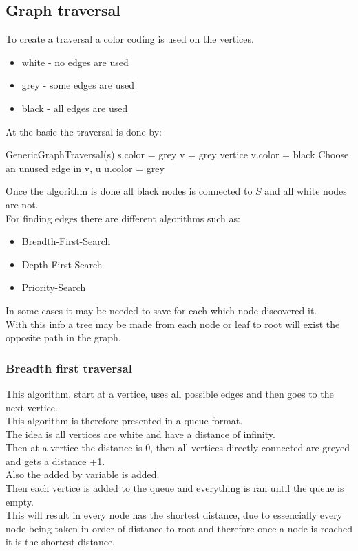 \documentclass[12pt, a4paper]{article}
\begin{document}
		\subsection{Graph traversal}
			To create a traversal a color coding is used on the vertices.
			\begin{itemize}
				\item white - no edges are used
				\item grey - some edges are used
				\item black - all edges are used
			\end{itemize}
			At the basic the traversal is done by:
			\begin{algorithmic}[1]
				\State GenericGraphTraversal(s)
				\State s.color = grey
					\State v = grey vertice
						\State v.color = black
					\Else 
						\State Choose an unused edge in v, u
							\State u.color = grey
						\EndIf
					\EndIf
				\EndWhile
				
			\end{algorithmic}
			Once the algorithm is done all black nodes is connected to $S$ and all white nodes are not.\\
			For finding edges there are different algorithms such as:
			\begin{itemize}
				\item Breadth-First-Search
				\item Depth-First-Search
				\item Priority-Search
			\end{itemize}
			In some cases it may be needed to save for each which node discovered it.\\
			With this info a tree may be made from each node or leaf to root will exist the opposite path in the graph.\\
			\subsubsection{Breadth first traversal}
				This algorithm, start at a vertice, uses all possible edges and then goes to the next vertice.\\
				This algorithm is therefore presented in a queue format.\\
				The idea is all vertices are white and have a distance of infinity.\\
				Then at a vertice the distance is 0, then all vertices directly connected are greyed and gets a distance +1.\\
				Also the added by variable is added.\\
				Then each vertice is added to the queue and everything is ran until the queue is empty.\\
				This will result in every node has the shortest distance, due to essencially every node being taken in order of distance to root and therefore once a node is reached it is the shortest distance.\\
\end{document}

